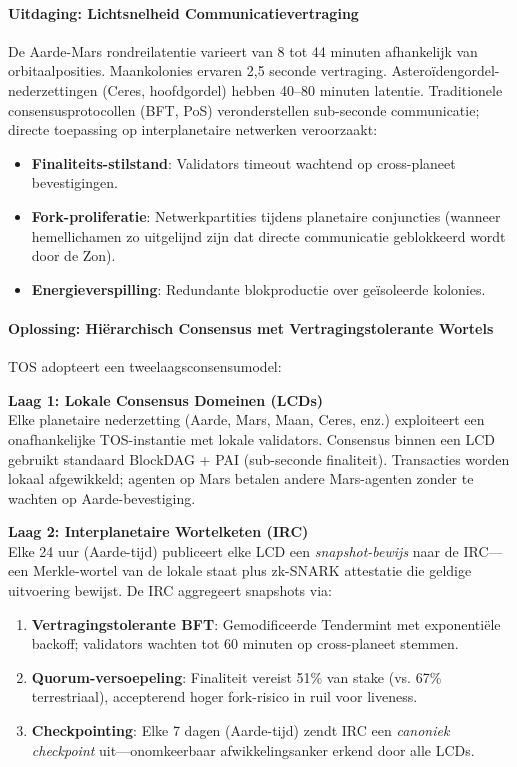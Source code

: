 \documentclass[11pt]{article}
\begin{document}
\paragraph{Uitdaging: Lichtsnelheid Communicatievertraging}
De Aarde-Mars rondreilatentie varieert van 8 tot 44 minuten afhankelijk van orbitaalposities. Maankolonies ervaren 2,5 seconde vertraging. Asteroïdengordel-nederzettingen (Ceres, hoofdgordel) hebben 40--80 minuten latentie. Traditionele consensusprotocollen (BFT, PoS) veronderstellen sub-seconde communicatie; directe toepassing op interplanetaire netwerken veroorzaakt:
\begin{itemize}[noitemsep]
  \item \textbf{Finaliteits-stilstand}: Validators timeout wachtend op cross-planeet bevestigingen.
  \item \textbf{Fork-proliferatie}: Netwerkpartities tijdens planetaire conjuncties (wanneer hemellichamen zo uitgelijnd zijn dat directe communicatie geblokkeerd wordt door de Zon).
  \item \textbf{Energieverspilling}: Redundante blokproductie over geïsoleerde kolonies.
\end{itemize}

\paragraph{Oplossing: Hiërarchisch Consensus met Vertragingstolerante Wortels}
TOS adopteert een tweelaagsconsensumodel:

\textbf{Laag 1: Lokale Consensus Domeinen (LCDs)}\\
Elke planetaire nederzetting (Aarde, Mars, Maan, Ceres, enz.) exploiteert een onafhankelijke TOS-instantie met lokale validators. Consensus binnen een LCD gebruikt standaard BlockDAG + PAI (sub-seconde finaliteit). Transacties worden lokaal afgewikkeld; agenten op Mars betalen andere Mars-agenten zonder te wachten op Aarde-bevestiging.

\textbf{Laag 2: Interplanetaire Wortelketen (IRC)}\\
Elke 24 uur (Aarde-tijd) publiceert elke LCD een \emph{snapshot-bewijs} naar de IRC—een Merkle-wortel van de lokale staat plus zk-SNARK attestatie die geldige uitvoering bewijst. De IRC aggregeert snapshots via:
\begin{enumerate}[noitemsep]
  \item \textbf{Vertragingstolerante BFT}: Gemodificeerde Tendermint met exponentiële backoff; validators wachten tot 60 minuten op cross-planeet stemmen.
  \item \textbf{Quorum-versoepeling}: Finaliteit vereist 51\% van stake (vs. 67\% terrestriaal), accepterend hoger fork-risico in ruil voor liveness.
  \item \textbf{Checkpointing}: Elke 7 dagen (Aarde-tijd) zendt IRC een \emph{canoniek checkpoint} uit—onomkeerbaar afwikkelingsanker erkend door alle LCDs.
\end{enumerate}
\end{document}
